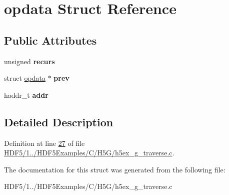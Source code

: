 \hypertarget{structopdata}{}\section{opdata Struct Reference}
\label{structopdata}
\subsection*{Public Attributes}
\begin{DoxyCompactItemize}
\item 
\mbox{\label{structopdata_a45e0f6b082939684945a016bbc053507}} 
unsigned {\bfseries recurs}
\item 
\mbox{\label{structopdata_abbed2ff2f211b665f72be3a3af9a15da}} 
struct \hyperlink{structopdata}{opdata} $\ast$ {\bfseries prev}
\item 
\mbox{\label{structopdata_a12e1bf828a0cb70253d508355a825512}} 
haddr\+\_\+t {\bfseries addr}
\end{DoxyCompactItemize}


\subsection{Detailed Description}


Definition at line \hyperlink{_h_d_f5_21_810_81_2_h_d_f5_examples_2_c_2_h5_g_2h5ex__g__traverse_8c_source_l00027}{27} of file \hyperlink{_h_d_f5_21_810_81_2_h_d_f5_examples_2_c_2_h5_g_2h5ex__g__traverse_8c_source}{H\+D\+F5/1../\+H\+D\+F5\+Examples/\+C/\+H5\+G/h5ex\+\_\+g\+\_\+traverse.\+c}.



The documentation for this struct was generated from the following file\+:\begin{DoxyCompactItemize}
\item 
H\+D\+F5/1../\+H\+D\+F5\+Examples/\+C/\+H5\+G/h5ex\+\_\+g\+\_\+traverse.\+c\end{DoxyCompactItemize}
